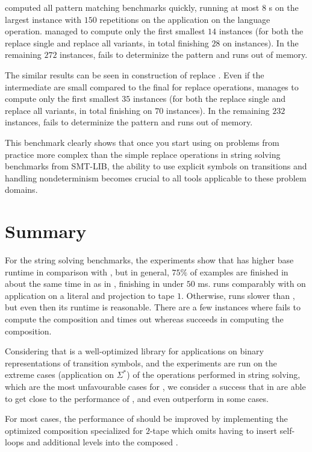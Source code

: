 \mata computed all pattern matching benchmarks quickly, running at most $8$ s on the largest instance with $150$ repetitions on the application on the language operation.
\mona managed to compute only the first smallest $14$ instances (for both the replace single and replace all variants, in total finishing $28$ on instances).
In the remaining $272$ instances, \mona fails to determinize the pattern and runs out of memory.

The similar results can be seen in construction of replace \nfts. Even if the intermediate \nfts are small compared to the final \nfts for replace operations, \mona manages to compute only the first smallest $35$ instances (for both the replace single and replace all variants, in total finishing on $70$ instances).
In the remaining $232$ instances, \mona fails to determinize the pattern and runs out of memory.

This benchmark clearly shows that once you start using \nfts on problems from practice more complex than the simple replace operations in string solving benchmarks from SMT-LIB, the ability to use explicit symbols on transitions and handling nondeterminism becomes crucial to all tools applicable to these problem domains.

\section{Summary}

For the string solving benchmarks, the experiments show that \mata has higher base runtime in comparison with \mona, but in general, $75 \%$ of examples are finished in about the same time in \mata as in \mona, finishing in under $50$ ms.
\mata runs comparably with \mona on application on a literal and projection to tape $1$.
Otherwise, \mata runs slower than \mona, but even then its runtime is reasonable.
There are a few instances where \mata fails to compute the composition and times out whereas \mona succeeds in computing the composition.

Considering that \mona is a well-optimized library for applications on binary representations of transition symbols, and the experiments are run on the extreme cases (application on $\Sigma^*$) of the operations performed in string solving, which are the most unfavourable cases for \mata, we consider a success that \nfts in \mata are able to get close to the performance of \mona, and even outperform \mona in some cases.

For most cases, the performance of \mata should be improved by implementing the optimized composition specialized for $2$-tape \nfts which omits having to insert self-loops and additional levels into the composed \nfts.

